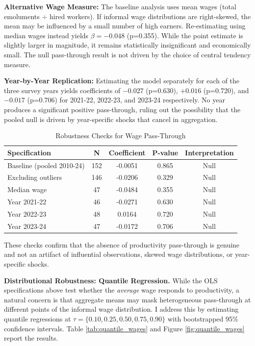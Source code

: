 \textbf{Alternative Wage Measure:} The baseline analysis uses mean wages (total emoluments $\div$ hired workers). If informal wage distributions are right-skewed, the mean may be influenced by a small number of high earners. Re-estimating using median wages instead yields $\beta=-0.048$ (p=0.355). While the point estimate is slightly larger in magnitude, it remains statistically insignificant and economically small. The null pass-through result is not driven by the choice of central tendency measure.

\textbf{Year-by-Year Replication:} Estimating the model separately for each of the three survey years yields coefficients of $-0.027$ (p=0.630), $+0.016$ (p=0.720), and $-0.017$ (p=0.706) for 2021-22, 2022-23, and 2023-24 respectively. No year produces a significant positive pass-through, ruling out the possibility that the pooled null is driven by year-specific shocks that cancel in aggregation.

\begin{table}[H]
	\centering
	\caption{Robustness Checks for Wage Pass-Through}
	\label{tab:wage_robustness}
	\begin{tabular}{lcccc}
		\toprule
		Specification & N & Coefficient & P-value & Interpretation \\
		\midrule
		Baseline (pooled 2010-24) & 152 & -0.0051 & 0.865 & Null \\
		Excluding outliers & 146 & -0.0206 & 0.329 & Null \\
		Median wage & 47 & -0.0484 & 0.355 & Null \\
		Year 2021-22 & 46 & -0.0271 & 0.630 & Null \\
		Year 2022-23 & 48 & 0.0164 & 0.720 & Null \\
		Year 2023-24 & 47 & -0.0172 & 0.706 & Null \\
		\bottomrule
	\end{tabular}
\end{table}

These checks confirm that the absence of productivity pass-through is genuine and not an artifact of influential observations, skewed wage distributions, or year-specific shocks.

\textbf{Distributional Robustness: Quantile Regression.} While the OLS specifications above test whether the \textit{average} wage responds to productivity, a natural concern is that aggregate means may mask heterogeneous pass-through at different points of the informal wage distribution. I address this by estimating quantile regressions at $\tau = \{0.10, 0.25, 0.50, 0.75, 0.90\}$ with bootstrapped 95\% confidence intervals. Table \ref{tab:quantile_wages} and Figure \ref{fig:quantile_wages} report the results.


